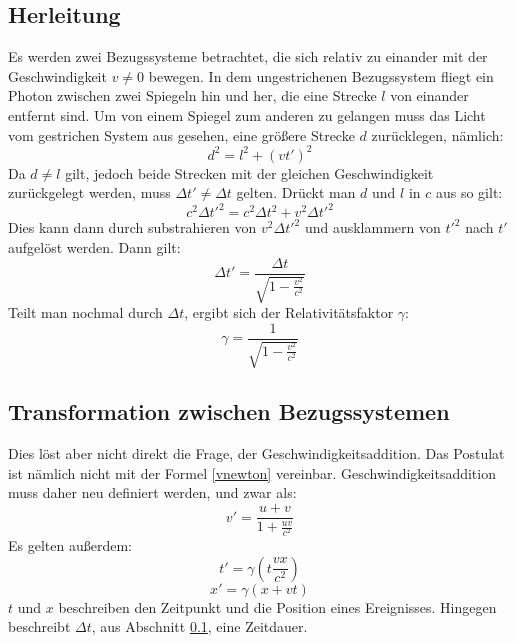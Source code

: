 \documentclass[12pt]{article}
\begin{document}
\subsection{Herleitung}
\label{herl}
Es werden zwei Bezugssysteme betrachtet, die sich relativ zu einander mit der Geschwindigkeit $v \neq 0$ bewegen.
In dem ungestrichenen Bezugssystem fliegt ein Photon zwischen zwei Spiegeln hin und her, die eine Strecke $l$ von einander entfernt sind.
Um von einem Spiegel zum anderen zu gelangen muss das Licht vom gestrichen System aus gesehen, eine größere Strecke $d$ zurücklegen, nämlich:
\begin{equation}
d^2 = l^2 + (vt')^2
\end{equation}
Da $d \neq l$ gilt, jedoch beide Strecken mit der gleichen Geschwindigkeit zurückgelegt werden, muss $\Delta t' \neq \Delta t$ gelten.
Drückt man $d$ und $l$ in $c$ aus so gilt:
\begin{equation}
c^2 \Delta t'^2 = c^2 \Delta t^2 + v^2 \Delta t'^2
\end{equation}
Dies kann dann durch substrahieren von $v^2 \Delta t'^2$ und ausklammern von $t'^2$ nach $t'$ aufgelöst werden.
Dann gilt:
\begin{equation}
\Delta t' = \frac{\Delta t}{\sqrt{1-\frac{v^2}{c^2}}}
\end{equation}
Teilt man nochmal durch $\Delta t$, ergibt sich der Relativitätsfaktor $\gamma$:
\begin{equation}
\label{gamma}
\gamma = \frac{1}{\sqrt{1-\frac{v^2}{c^2}}}
\end{equation}

\subsection{Transformation zwischen Bezugssystemen}
\label{trans}
Dies löst aber nicht direkt die Frage, der Geschwindigkeitsaddition.
Das Postulat ist nämlich nicht mit der Formel \ref{vnewton} vereinbar.
Geschwindigkeitsaddition muss daher neu definiert werden, und zwar als:
\begin{equation}
\label{v}
v' = \frac{u + v}{1 + \frac{uv}{c^2}}
\end{equation}
Es gelten außerdem:
\begin{equation}
t' = \gamma(t \frac{vx}{c^2})
\end{equation}
\begin{equation}
x' = \gamma(x + vt)
\end{equation}
$t$ und $x$ beschreiben den Zeitpunkt und die Position eines Ereignisses.
Hingegen beschreibt $\Delta t$, aus Abschnitt \ref{herl}, eine Zeitdauer.
\end{document}

